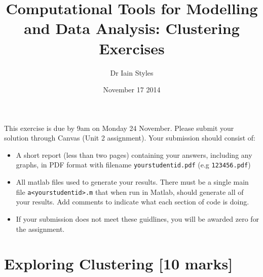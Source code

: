 \documentclass[12pt,a4paper]{tufte-handout}
\title{Computational Tools for Modelling and Data Analysis: Clustering Exercises}
\date{November 17 2014}
\author{Dr Iain Styles}
\begin{document}
\maketitle
This exercise is due by 9am on Monday 24 November. Please submit your solution 
through Canvas (Unit 2 assignment). Your submission should consist of:
\begin{itemize}
  \item A short report (less than two pages) containing your answers, including  any graphs, in PDF format with filename \texttt{yourstudentid.pdf} (e.g \texttt{123456.pdf})
  \item All matlab files used to generate your results. There must be a single main file \texttt{a<yourstudentid>.m} that when run in Matlab, should generate all of your results. Add comments to indicate what each section of code is doing.
  \item If your submission does not meet these guidlines, you will be awarded zero for the assignment.
\end{itemize}

\section{Exploring Clustering [10 marks]}
\end{document}
